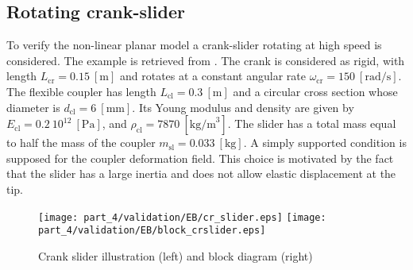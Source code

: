 \subsection{Rotating crank-slider}
To verify the non-linear planar model a crank-slider rotating at high speed is considered. The example is retrieved from \cite{ellenbroek2018}.  The crank is considered as rigid, with length $L_{\text{cr}} = 0.15 \ [\mathrm{m}]$ and rotates at a constant angular rate $\omega_{\text{cr}} = 150 \ [\mathrm{rad/s}]$. The flexible coupler has length $L_{\text{cl}} = 0.3 \ [\mathrm{m}]$ and a circular cross section whose diameter is $d_{\text{cl}} = 6 \ [\mathrm{mm}]$. Its Young modulus and density are given by $E_{\text{cl}}=0.2 \ 10^{12} \ [\mathrm{Pa}]$, and $\rho_{\text{cl}}=7870 \ [\mathrm{kg/m}^3]$. The slider has a total mass equal to half the mass of the coupler $m_{\text{sl}} = 0.033 \ [\mathrm{kg}]$. A simply supported condition is supposed for the coupler deformation field. This choice is motivated by the fact that the slider has a large inertia and does not allow elastic displacement at the tip.

\begin{figure}[tb]
	\centering
	\texttt{[image: part\_4/validation/EB/cr\_slider.eps]} 
	\texttt{[image: part\_4/validation/EB/block\_crslider.eps]} 
	\caption{Crank slider illustration (left) and block diagram (right)}
	\label{fig:crsl}
\end{figure}

